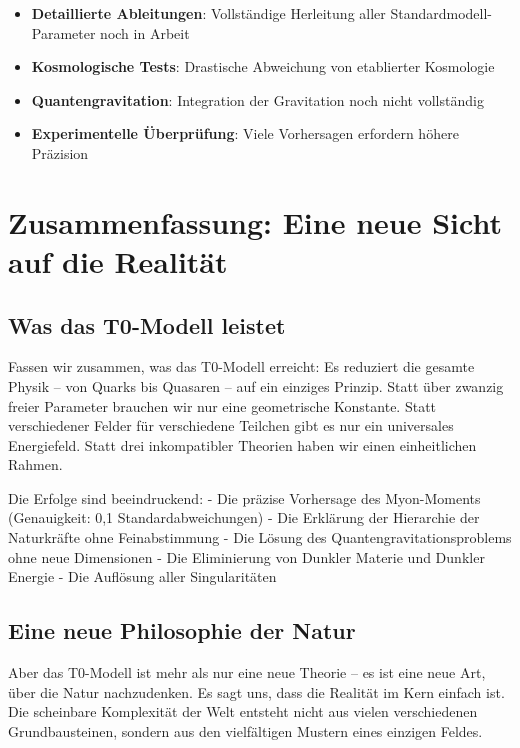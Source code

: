 \documentclass[12pt,a4paper]{article}
\begin{document}
	\begin{itemize}
		\item \textbf{Detaillierte Ableitungen}: Vollständige Herleitung aller Standardmodell-Parameter noch in Arbeit
		\item \textbf{Kosmologische Tests}: Drastische Abweichung von etablierter Kosmologie
		\item \textbf{Quantengravitation}: Integration der Gravitation noch nicht vollständig
		\item \textbf{Experimentelle Überprüfung}: Viele Vorhersagen erfordern höhere Präzision
	\end{itemize}
	
	\section{Zusammenfassung: Eine neue Sicht auf die Realität}
	
	\subsection{Was das T0-Modell leistet}
	
	Fassen wir zusammen, was das T0-Modell erreicht: Es reduziert die gesamte Physik -- von Quarks bis Quasaren -- auf ein einziges Prinzip. Statt über zwanzig freier Parameter brauchen wir nur eine geometrische Konstante. Statt verschiedener Felder für verschiedene Teilchen gibt es nur ein universales Energiefeld. Statt drei inkompatibler Theorien haben wir einen einheitlichen Rahmen.
	
	Die Erfolge sind beeindruckend:
	- Die präzise Vorhersage des Myon-Moments (Genauigkeit: 0,1 Standardabweichungen)
	- Die Erklärung der Hierarchie der Naturkräfte ohne Feinabstimmung
	- Die Lösung des Quantengravitationsproblems ohne neue Dimensionen
	- Die Eliminierung von Dunkler Materie und Dunkler Energie
	- Die Auflösung aller Singularitäten
	
	\subsection{Eine neue Philosophie der Natur}
	
	Aber das T0-Modell ist mehr als nur eine neue Theorie -- es ist eine neue Art, über die Natur nachzudenken. Es sagt uns, dass die Realität im Kern einfach ist. Die scheinbare Komplexität der Welt entsteht nicht aus vielen verschiedenen Grundbausteinen, sondern aus den vielfältigen Mustern eines einzigen Feldes.
	
\end{document}
